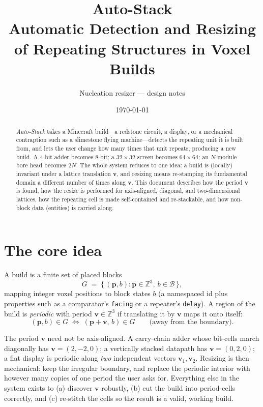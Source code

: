 \documentclass[11pt]{article}
\title{\textbf{Auto-Stack}\\[2pt]
\large Automatic Detection and Resizing of Repeating Structures in Voxel Builds}
\author{Nucleation resizer --- design notes}
\date{\today}
\newcommand{\Z}{\mathbb{Z}}
\newcommand{\vv}{\mathbf{v}}
\newcommand{\pp}{\mathbf{p}}
\begin{document}
\maketitle

\begin{abstract}
\emph{Auto-Stack} takes a Minecraft build---a redstone circuit, a display, or a
mechanical contraption such as a slimestone flying machine---detects the
repeating unit it is built from, and lets the user change how many times that
unit repeats, producing a new build. A 4-bit adder becomes 8-bit; a $32\times32$
screen becomes $64\times64$; an $N$-module bore head becomes $2N$. The whole
system reduces to one idea: a build is (locally) invariant under a lattice
translation $\vv$, and resizing means re-stamping its fundamental domain a
different number of times along $\vv$. This document describes how the period
$\vv$ is found, how the resize is performed for axis-aligned, diagonal, and
two-dimensional lattices, how the repeating cell is made self-contained and
re-stackable, and how non-block data (entities) is carried along.
\end{abstract}

\tableofcontents

\section{The core idea}

A build is a finite set of placed blocks
\[
G \;=\; \{\,(\pp, b) : \pp \in \Z^3,\ b \in \mathcal{B}\,\},
\]
mapping integer voxel positions to block states $b$ (a namespaced id plus
properties such as a comparator's \texttt{facing} or a repeater's
\texttt{delay}). A region of the build is \emph{periodic} with period
$\vv \in \Z^3$ if translating it by $\vv$ maps it onto itself:
\[
(\pp, b) \in G \;\Longleftrightarrow\; (\pp + \vv,\, b) \in G
\qquad\text{(away from the boundary).}
\]

The period $\vv$ need not be axis-aligned. A carry-chain adder whose bit-cells
march diagonally has $\vv=(2,-2,0)$; a vertically stacked datapath has
$\vv=(0,2,0)$; a flat display is periodic along \emph{two} independent vectors
$\vv_1,\vv_2$. Resizing is then mechanical: keep the irregular boundary, and
replace the periodic interior with however many copies of one period the user
asks for. Everything else in the system exists to (a) discover $\vv$ robustly,
(b) cut the build into period-cells correctly, and (c) re-stitch the cells so the
result is a valid, working build.
\end{document}
